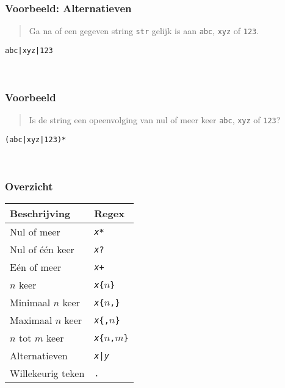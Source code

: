 \begin{frame}
  \frametitle{Voorbeeld: Alternatieven}
  \begin{quote}
    Ga na of een gegeven string \texttt{str}
    gelijk is aan \texttt{abc}, \texttt{xyz} of \texttt{123}.
  \end{quote}
  \vskip2mm
  \begin{center}
    \texttt{abc|xyz|123}
  \end{center}
  \begin{matchexamples}
    \\[2mm]
  \end{matchexamples}
\end{frame}

\begin{frame}
  \frametitle{Voorbeeld}
  \begin{quote}
    Is de string een opeenvolging van nul of meer keer \texttt{abc}, \texttt{xyz} of \texttt{123}?
  \end{quote}
  \vskip2mm
  \begin{center}
    \texttt{(abc|xyz|123)*}
  \end{center}
  \begin{matchexamples}
    \match{}
    \\[2mm]
  \end{matchexamples}
\end{frame}

\begin{frame}
  \frametitle{Overzicht}
  \begin{center}
    \begin{tabular}{ll}
      \toprule
      \textbf{Beschrijving} & \textbf{Regex} \\
      \midrule
      Nul of meer & \texttt{{\itshape x}*} \\
      Nul of \'e\'en keer & \texttt{{\itshape x}?} \\
      E\'en of meer & \texttt{{\itshape x}+} \\
      $n$ keer & \texttt{{\itshape x}\{$n$\}} \\
      Minimaal $n$ keer & \texttt{{\itshape x}\{$n$,\}} \\
      Maximaal $n$ keer & \texttt{{\itshape x}\{,$n$\}} \\
      $n$ tot $m$ keer & \texttt{{\itshape x}\{$n$,$m$\}} \\
      Alternatieven & \texttt{{\itshape x}|{\itshape y}} \\
      Willekeurig teken & \texttt{.} \\
      \bottomrule
    \end{tabular}
  \end{center}
\end{frame}

